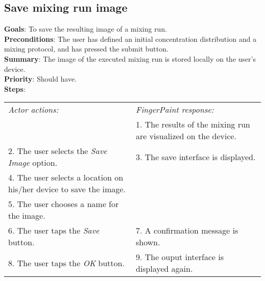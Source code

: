 \begin{appendices}
\section{Save mixing run image}
  \textbf{Goals}: To save the resulting image of a mixing run.\\
  \textbf{Preconditions}: The user has defined an initial concentration distribution and a mixing protocol, and has pressed the submit button.\\
  \textbf{Summary}: The image of the executed mixing run is stored locally on the user's device.\\
  \textbf{Priority}: Should have.\\
  \textbf{Steps}: \\
  \begin{tabular}{ p{} p{} }
  	\emph{Actor actions:} & \emph{FingerPaint response:} \\
	   & 1. The results of the mixing run are visualized on the device. \\
	 2. The user selects the \emph{Save Image} option. & 3. The save interface is displayed.\\
	 4. The user selects a location on his/her device to save the image. & \\
	 5. The user chooses a name for the image. & \\
	 6. The user taps the \emph{Save} button. & 7. A confirmation message is shown. \\
	 8. The user taps the \emph{OK} button. & 9. The ouput interface is displayed again. \\
  \end{tabular}
  

\end{appendices}
